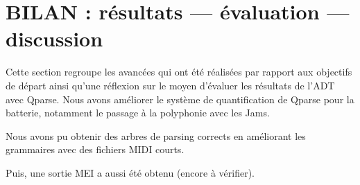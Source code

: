 \section{BILAN : résultats — évaluation — discussion}

Cette section regroupe les avancées qui ont été réalisées par rapport aux
objectifs de départ ainsi qu’une réflexion sur le moyen d’évaluer les résultats
de l’ADT avec Qparse. Nous avons améliorer le système de quantification de
Qparse pour la batterie, notamment le passage à la polyphonie avec les Jams. 

Nous avons pu obtenir des arbres de parsing corrects en améliorant les
grammaires avec des fichiers MIDI courts. 

Puis, une sortie MEI a aussi été obtenu (encore à vérifier).



